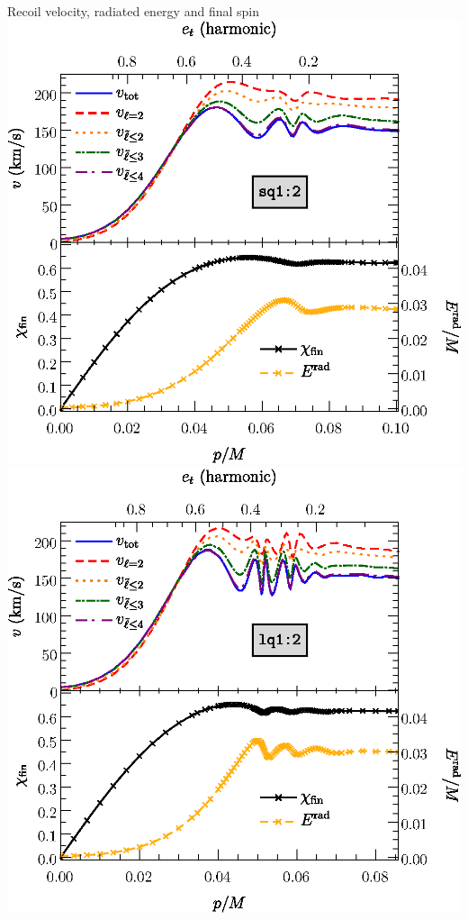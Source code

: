 \documentclass[smaller,aspectratio=169]{beamer}
\begin{document}
\begin{frame}{Recoil velocity, radiated energy and final spin}
	\includegraphics[width=0.45\linewidth]{kick-q2-wlabel.eps}
	\hfill
	\includegraphics[width=0.45\linewidth]{kick-q2l-wlabel.eps}
\end{frame}
\end{document}
